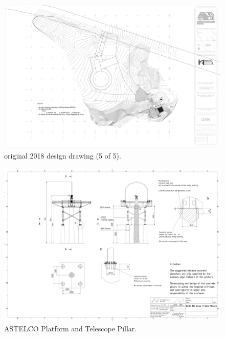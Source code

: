 \begin{figure}
\begin{center}
\includegraphics[height=0.95\linewidth,angle=90]{figures/buildings-coatli-drawing-2015-5.pdf}
\end{center}
\caption{{\projectname} original 2018 design drawing (5 of 5).}
\label{figure:buildings-drawing-2015-5}
\end{figure}

\begin{figure}
\begin{center}
\includegraphics[height=0.95\linewidth,angle=90]{figures/buildings-coatli-astelco-enclosure-drawing-6610}
\end{center}
\caption{{\projectname} ASTELCO Platform and Telescope Pillar.}
\label{figure:buildings-drawing-astelco}
\end{figure}

